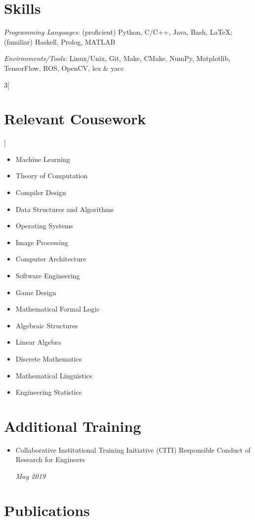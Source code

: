 \documentclass[\ifdefined\cv11pt\else10pt\fi,letterpaper,roman]{moderncv}
\def\cv{}
\newcommand{\cvonly}[1]{\ifdefined\cv#1\fi}
\renewcommand{\cvitem}[2]{\item {#1}\hfill\textit{#2}}
\let\oldsection\section
\renewcommand{\section}[1]{\vspace*{-1.3ex}\oldsection{#1}\vspace*{-0.5ex}}
\begin{document}
\setlength{\premulticols}{0pt}
\section{Skills}
\textit{Programming Languages:} (proficient) Python, C/C++, Java, Bash, \LaTeX; (familiar) Haskell, Prolog, MATLAB \par
\textit{Environments/Tools:} Linux/Unix, Git, Make, CMake, NumPy, Matplotlib, TensorFlow, ROS, OpenCV, lex \& yacc \par %
\begin{multicols}{3}[\section{Relevant Cousework}\vspace*{-1.2\topsep}]
\begin{itemize}
	\item Machine Learning
	\item Theory of Computation
	\item Compiler Design
	\item Data Structures and Algorithms
	\item Operating Systems
	\item Image Processing
	\item Computer Architecture
	\item Software Engineering
	\cvonly{\item Game Design}
	\item Mathematical Formal Logic
	\item Algebraic Structures
	\item Linear Algebra
	\item Discrete Mathematics
	\cvonly{
		\item Mathematical Linguistics
		\item Engineering Statistics
	}
\end{itemize}
\end{multicols}
\vspace{-2.8ex}

\cvonly{
\section{Additional Training}
\begin{itemize}
	\cvitem{
		\parbox[t]{0.85\linewidth}{Collaborative Institutional Training Initiative (CITI) Responsible Conduct of Research for Engineers}}{May 2019}
\end{itemize}
}


\section{Publications}
	\nocite{uwcl,damron2019,dfki2016,marios_trajopt}
	\printbibliography[heading=none]{}
\end{document}
